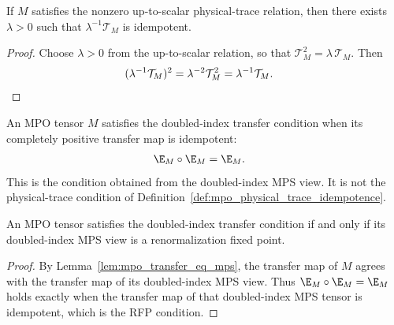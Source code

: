 \begin{lemma}
    \label{lem:mpo_source_zcl_normalized_idempotent}
    \leanok
    If $M$ satisfies the nonzero up-to-scalar physical-trace relation, then
    there exists $\lambda>0$ such that
    $\lambda^{-1}\mathcal T_M$ is idempotent.
\end{lemma}

\begin{proof}
    \leanok
    Choose $\lambda>0$ from the up-to-scalar relation, so that
    $\mathcal T_M^2=\lambda\,\mathcal T_M$. Then
    \begin{align}
        (\lambda^{-1}\mathcal T_M)^2
         & =\lambda^{-2}\mathcal T_M^2
        =\lambda^{-1}\mathcal T_M.
        \notag
    \end{align}
\end{proof}

\begin{definition}%
    \label{def:mpo_is_zcl}
    \leanok
    An MPO tensor $M$ satisfies the doubled-index transfer condition when its
    completely positive transfer map is idempotent:
    \begin{align}
        \E_M\circ\E_M & =\E_M.
        \notag
    \end{align}
    This is the condition obtained from the doubled-index MPS view. It is not
    the physical-trace condition of
    Definition~\ref{def:mpo_physical_trace_idempotence}.
\end{definition}

\begin{lemma}%
    \label{thm:mpo_is_zcl_iff_to_mps_rfp}
    \leanok
    An MPO tensor satisfies the doubled-index transfer condition if and only if
    its doubled-index MPS view is a renormalization fixed point.
\end{lemma}

\begin{proof}
    \leanok
    By Lemma~\ref{lem:mpo_transfer_eq_mps}, the transfer map of $M$ agrees with
    the transfer map of its doubled-index MPS view. Thus
    $\E_M\circ\E_M=\E_M$ holds exactly when the transfer map of
    that doubled-index MPS tensor is idempotent, which is the RFP condition.
\end{proof}

